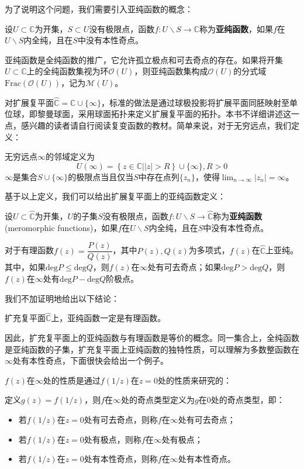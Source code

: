 \documentclass{ctexbook}
\begin{document}
为了说明这个问题，我们需要引入亚纯函数的概念\cite{Function_Theory}：
\begin{definition}[亚纯函数]
    设$U\subset\mathbb{C}$为开集，$S\subset U$没有极限点，函数$f:U\backslash S\to\mathbb{C}$称为\textbf{亚纯函数}，如果$f$在$U\backslash S$内全纯，且在$S$中没有本性奇点。
\end{definition}

亚纯函数是全纯函数的推广，它允许孤立极点和可去奇点的存在。如果将开集$U\subset \mathbb{C}$上的全纯函数集视为环$\mathcal{O} (U)$，则亚纯函数集构成$\mathcal{O} (U)$的分式域$\text{Frac}(\mathcal{O} (U))$，记为$\mathcal{M} (U)$。

对扩展复平面$\hat{\mathbb{C}}=\mathbb{C}\cup\{\infty\}$，标准的做法是通过球极投影将扩展平面同胚映射至单位球，即黎曼球面，采用球面拓扑来定义扩展复平面的拓扑。本书不详细讲述这一点，感兴趣的读者请自行阅读复变函数的教材。简单来说，对于无穷远点，我们定义：
\begin{definition}[无穷远点的邻域]
    无穷远点$\infty$的邻域定义为
    \[U(\infty)=\left\{\left.z\in\mathbb{C} \right||z|>R\right\}\cup\{\infty\},R>0\]
    $\infty$是集合$S\cup\{\infty\}$的极限点当且仅当$S$中存在点列$\{z_n\}$，使得$\lim_{n\to\infty}|z_n|=\infty$。
\end{definition}
基于以上定义，我们可以给出扩展复平面上的亚纯函数定义：
\begin{definition}[扩展复平面上的亚纯函数]
    设$U\subset\hat{\mathbb{C}}$为开集，$U$的子集$S$没有极限点，函数$f:U\backslash S\to\hat{\mathbb{C}}$称为\textbf{亚纯函数}(meromorphic functions)，如果$f$在$U\backslash S$内全纯，且在$S$中没有本性奇点。
\end{definition}
\begin{example}
    对于有理函数$f(z)=\dfrac{P(z)}{Q(z)}$，其中$P(z),Q(z)$为多项式，$f(z)$在$\hat{\mathbb{C}}$上亚纯。其中，如果$\text{deg}P\leq\text{deg}Q$，则$f(z)$在$\infty$处有可去奇点；如果$\text{deg}P>\text{deg}Q$，则$f(z)$在$\infty$处有$\text{deg}P-\text{deg}Q$阶极点。
\end{example}
我们不加证明地给出以下结论\cite{Function_Theory}：
\begin{claim}
    扩充复平面$\hat{\mathbb{C}}$上，亚纯函数一定是有理函数。
\end{claim}
因此，扩充复平面上的亚纯函数与有理函数是等价的概念。同一集合上，全纯函数是亚纯函数的子集，扩充复平面上亚纯函数的独特性质，可以理解为多数整函数在$\infty$处有本性奇点，下面很快会给出一个例子。

$f(z)$在$\infty$处的性质是通过$f(1/z)$在$z=0$处的性质来研究的：
\begin{definition}[无穷远点的奇点类型]
    定义$g(z)=f(1/z)$，则$f$在$\infty$处的奇点类型定义为$g$在$0$处的奇点类型，即：
    \begin{itemize}
        \item 若$f(1/z)$在$z=0$处有可去奇点，则称$f$在$\infty$处有可去奇点；
        \item 若$f(1/z)$在$z=0$处有极点，则称$f$在$\infty$处有极点；
        \item 若$f(1/z)$在$z=0$处有本性奇点，则称$f$在$\infty$处有本性奇点。
    \end{itemize}
\end{definition}
\end{document}
